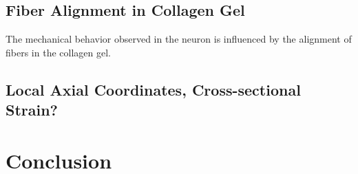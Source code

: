 \documentclass[10pt]{asme2ej}
\begin{document}
\subsection{Fiber Alignment in Collagen Gel}
The mechanical behavior observed in the neuron is influenced by the alignment of fibers in the collagen gel.
%
%
\subsection{Local Axial Coordinates, Cross-sectional Strain?}

\section{Conclusion}

\begin{acknowledgment}

\end{acknowledgment}

%
\newpage



\end{document}
